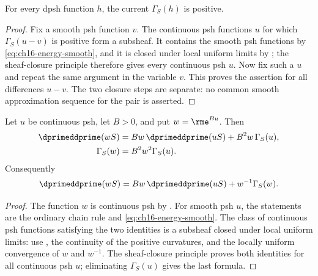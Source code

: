 \begin{proposition}
\label{prop:ch16-energy-positivity}
For every dpsh function $h$, the current $\Gamma_S(h)$ is positive.
\end{proposition}

\begin{proof}
Fix a smooth psh function $v$.  The continuous psh functions $u$ for which
$\Gamma_S(u-v)$ is positive form a subsheaf.  It contains the smooth psh
functions by \eqref{eq:ch16-energy-smooth}, and it is closed under local
uniform limits by ; the sheaf-closure
principle therefore gives every continuous psh $u$.  Now fix such a $u$ and
repeat the same argument in the variable $v$.  This proves the assertion for
all differences $u-v$.  The two closure steps are separate: no common smooth
approximation sequence for the pair is asserted.
\end{proof}

\begin{proposition}
\label{prop:ch16-energy-exponential}
Let $u$ be continuous psh, let $B>0$, and put $w=\rme^{Bu}$.  Then
\begin{align}
 \dprimeddprime(wS)
   &=Bw\,\dprimeddprime(uS)+B^2w\,\Gamma_S(u),
       \label{eq:ch16-energy-exp-dd}\\
 \Gamma_S(w)&=B^2w^2\Gamma_S(u).                \label{eq:ch16-energy-exp-gamma}
\end{align}
Consequently
\begin{equation}
\label{eq:ch16-energy-exp-combined}
 \dprimeddprime(wS)
   =Bw\,\dprimeddprime(uS)+w^{-1}\Gamma_S(w).
\end{equation}
\end{proposition}

\begin{proof}
The function $w$ is continuous psh by
.  For smooth psh $u$, the statements are the
ordinary chain rule and \eqref{eq:ch16-energy-smooth}.  The class of
continuous psh functions satisfying the two identities is a subsheaf closed
under local uniform limits: use
, the continuity of the positive curvatures,
and the locally uniform convergence of $w$ and $w^{-1}$.  The sheaf-closure
principle proves both identities for all continuous psh $u$; eliminating
$\Gamma_S(u)$ gives the last formula.
\end{proof}

